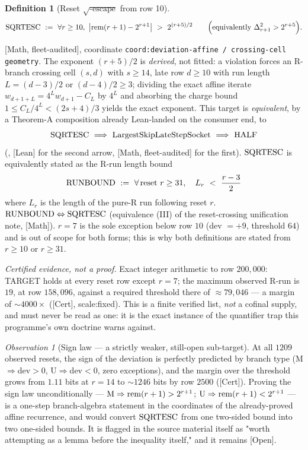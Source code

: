 \documentclass[11pt]{article}
\theoremstyle{plain}
\theoremstyle{definition}
\newtheorem{defn}[thm]{Definition}
\theoremstyle{remark}
\newtheorem{obs}[thm]{Observation}
\newcommand{\lean}[2]{\leanlink{#2}}
\let\origmathrm\mathrm
\renewcommand{\mathrm}[1]{\ifmmode\origmathrm{#1}\else\textrm{#1}\fi}%
\newcommand{\ev}[1]{{\small\textsf{[#1]}}\xspace}
\newcommand{\scale}[1]{{\small\textsf{scale:#1}}\xspace}
\newcommand{\coord}[1]{\texorpdfstring{{\small\nolinkurl{coord:#1}}}{coord:#1}\xspace}
\begin{document}
\begin{defn}[Reset $\sqrt{\text{-escape}}$ from row 10]
\[
\mathrm{SQRTESC}\ :=\ \forall r\ge 10,\ \big|\mathrm{rem}(r+1)-2^{r+1}\big|\ >\ 2^{(r+5)/2}
\qquad\Big(\text{equivalently } \Delta_{r+1}^2 > 2^{r+5}\Big).
\]
\end{defn}
\ev{Math, fleet-audited}, coordinate \coord{deviation-affine / crossing-cell geometry}. The
exponent $(r+5)/2$ is \emph{derived}, not fitted: a violation forces an R-branch crossing cell
$(s,d)$ with $s\ge14$, late row $d\ge10$ with run length $L=(d-3)/2$ or $(d-4)/2\ge3$; dividing
the exact affine iterate $w_{d+1+L}=4^Lw_{d+1}-C_L$ by $4^L$ and absorbing the charge bound
$1\le C_L/4^L<(2s+4)/3$ yields the exact exponent. This target is \emph{equivalent}, by a Theorem-A
composition already Lean-landed on the consumer end, to
\[
\mathrm{SQRTESC}\ \Longrightarrow\ \mathrm{LargestSkipLateStepSocket}\ \Longrightarrow\ \mathrm{HALF}
\]
(\lean{half_mem_mersenneAchievementSet_of_largestSkipLateStepSocket}{HalfCylinderLargestSkipInduction.lean:167}, \ev{Lean} for the second
arrow, \ev{Math, fleet-audited} for the first). $\mathrm{SQRTESC}$ is equivalently stated as the
R-run length bound
\[
\mathrm{RUNBOUND}\ :=\ \forall\,\text{reset}\ r\ge31,\quad L_r\ <\ \frac{r-3}{2}
\]
where $L_r$ is the length of the pure-R run following reset $r$. $\mathrm{RUNBOUND}\Leftrightarrow
\mathrm{SQRTESC}$ (equivalence (III) of the reset-crossing unification note, \ev{Math}). $r=7$ is
the sole exception below row $10$ (dev $=+9$, threshold $64$) and is out of scope for both forms;
this is why both definitions are stated from $r\ge10$ or $r\ge31$.

\emph{Certified evidence, not a proof.} Exact integer arithmetic to row $200{,}000$: TARGET holds
at every reset row except $r=7$; the maximum observed R-run is $19$, at row $158{,}096$, against a
required threshold there of $\approx79{,}046$ --- a margin of $\sim4000\times$
(\ev{Cert}, \scale{fixed}). This is a finite verified list, \emph{not} a cofinal supply, and must
never be read as one: it is the exact instance of the quantifier trap this programme's own
doctrine warns against.

\begin{obs}[Sign law --- a strictly weaker, still-open sub-target]
At all $1209$ observed resets, the sign of the deviation is perfectly predicted by branch type
(M$\Rightarrow$dev$>0$, U$\Rightarrow$dev$<0$, zero exceptions), and the margin over the threshold
grows from $1.11$ bits at $r=14$ to $\sim1246$ bits by row $2500$ (\ev{Cert}). Proving the sign
law unconditionally --- $\mathrm{M}\Rightarrow \mathrm{rem}(r+1)>2^{r+1}$;
$\mathrm{U}\Rightarrow \mathrm{rem}(r+1)<2^{r+1}$ --- is a one-step branch-algebra statement in the
coordinates of the already-proved affine recurrence, and would convert $\mathrm{SQRTESC}$ from one
two-sided bound into two one-sided bounds. It is flagged in the source material itself as "worth
attempting as a lemma before the inequality itself," and it remains \ev{Open}.
\end{obs}
\end{document}
